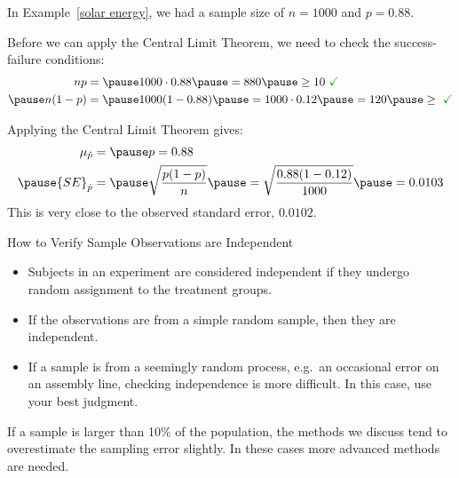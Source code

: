 \documentclass{beamer}
\begin{document}
\begin{frame}
  \begin{example}\label{solar CLT}
    \vspace{-2mm}%
    In Example~\ref{solar energy}, we had a sample size of $n=1000$ and $p=0.88$.\pause

    \vspace{1mm}
    Before we can apply the Central Limit Theorem, we need to check the success-failure conditions:
    \begin{equation*}
      \begin{aligned}
        np &= \pause
        1000\cdot 0.88\pause
        = 880\pause
        \geq 10~{\color{green!70!black}\checkmark} \\\pause
        n(1-p) &= \pause
        1000(1-0.88)\pause
        = 1000\cdot 0.12\pause
        = 120\pause
        \geq~{\color{green!70!black}\checkmark}
      \end{aligned}
    \end{equation*}\pause

    Applying the Central Limit Theorem gives:
    \begin{equation*}
      \begin{aligned}
        \mu_{\hat{p}} &=\pause
        p = 0.88 \\\pause
        {SE}_{\hat{p}} &= \pause
        \sqrt{\dfrac{p(1-p)}{n}}\pause
        = \sqrt{\dfrac{0.88(1-0.12)}{1000}}\pause
        = 0.0103
      \end{aligned}
    \end{equation*}\pause
    This is very close to the observed standard error, $0.0102$.
  \end{example}
\end{frame}

\begin{frame}
  \begin{block}{How to Verify Sample Observations are Independent}
    \begin{itemize}
    \item Subjects in an experiment are considered independent if they undergo random assignment to the treatment groups.\pause
    \item If the observations are from a simple random sample, then they are independent.\pause
    \item If a sample is from a seemingly random process, e.g.\  an occasional error on an assembly line, checking independence is more difficult. In this case, use your best judgment.
    \end{itemize}
  \end{block}\pause

  \begin{note}
    If a sample is larger than 10\% of the population, the methods we discuss tend to overestimate the sampling error slightly. In these cases more advanced methods are needed.
  \end{note}
\end{frame}
\end{document}
